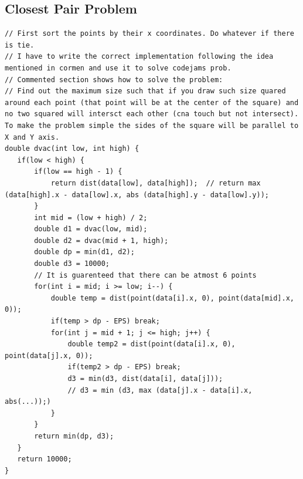 \documentclass[8pt, a4paper, oneside, twocolumn]{extarticle}
\begin{document}
\subsection{Closest Pair Problem}
\begin{verbatim}
// First sort the points by their x coordinates. Do whatever if there is tie.
// I have to write the correct implementation following the idea mentioned in cormen and use it to solve codejams prob.
// Commented section shows how to solve the problem: 
// Find out the maximum size such that if you draw such size quared around each point (that point will be at the center of the square) and no two squared will intersct each other (cna touch but not intersect). To make the problem simple the sides of the square will be parallel to X and Y axis.
double dvac(int low, int high) {
   if(low < high) {
       if(low == high - 1) {
           return dist(data[low], data[high]);  // return max (data[high].x - data[low].x, abs (data[high].y - data[low].y));  
       }
       int mid = (low + high) / 2;
       double d1 = dvac(low, mid);
       double d2 = dvac(mid + 1, high);
       double dp = min(d1, d2);
       double d3 = 10000;
       // It is guarenteed that there can be atmost 6 points
       for(int i = mid; i >= low; i--) {
           double temp = dist(point(data[i].x, 0), point(data[mid].x, 0));
           if(temp > dp - EPS) break;
           for(int j = mid + 1; j <= high; j++) {
               double temp2 = dist(point(data[i].x, 0), point(data[j].x, 0));
               if(temp2 > dp - EPS) break;
               d3 = min(d3, dist(data[i], data[j]));
               // d3 = min (d3, max (data[j].x - data[i].x, abs(...));)
           }
       }
       return min(dp, d3);
   }
   return 10000;
}

\end{verbatim}
\end{document}
